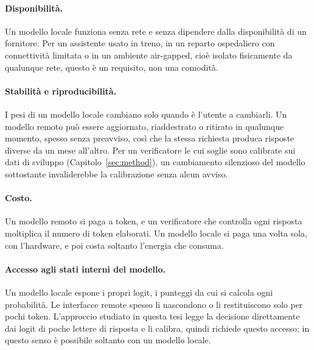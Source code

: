 \paragraph{Disponibilità.} Un modello locale funziona senza rete e senza dipendere dalla disponibilità di un fornitore.
Per un assistente usato in treno, in un reparto ospedaliero con connettività limitata o in un ambiente air-gapped, cioè isolato fisicamente da qualunque rete, questo
è un requisito, non una comodità.

\paragraph{Stabilità e riproducibilità.} I pesi di un modello locale cambiano solo quando è l'utente a cambiarli. Un
modello remoto può essere aggiornato, riaddestrato o ritirato in qualunque momento, spesso senza preavviso, così che la
stessa richiesta produca risposte diverse da un mese all'altro. Per un verificatore le cui soglie sono calibrate sui dati
di sviluppo (Capitolo~\ref{sec:method}), un cambiamento silenzioso del modello sottostante invaliderebbe la calibrazione
senza alcun avviso.

\paragraph{Costo.} Un modello remoto si paga a token, e un verificatore che controlla ogni risposta moltiplica il numero
di token elaborati. Un modello locale si paga una volta sola, con l'hardware, e poi costa soltanto l'energia che consuma.

\paragraph{Accesso agli stati interni del modello.} Un modello locale espone i propri logit, i punteggi da cui si calcola
ogni probabilità. Le interfacce remote spesso li nascondono o li restituiscono solo per pochi token. L'approccio studiato
in questa tesi legge la decisione direttamente dai logit di poche lettere di risposta e li calibra, quindi richiede
questo accesso; in questo senso è possibile soltanto con un modello locale.

